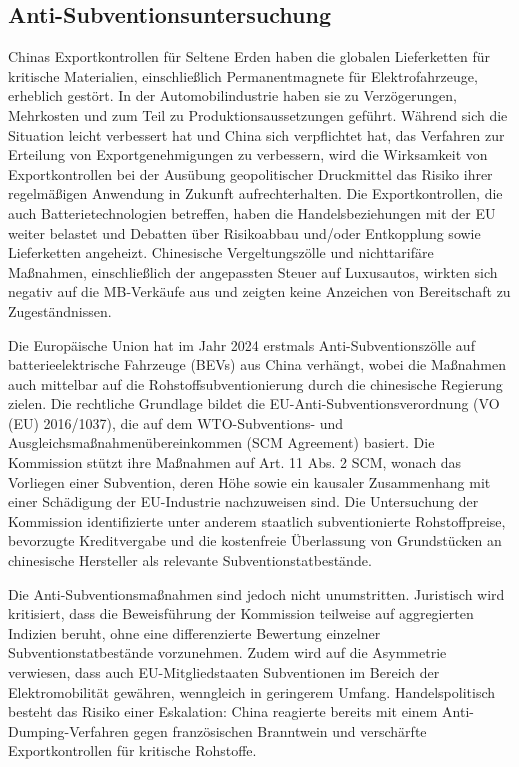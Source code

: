 \documentclass[12pt,a4paper,oneside]{book} %
\begin{document}
\subsection{Anti-Subventionsuntersuchung}
Chinas Exportkontrollen für Seltene Erden haben die globalen Lieferketten für kritische Materialien, einschließlich Permanentmagnete für Elektrofahrzeuge, erheblich gestört. In der Automobilindustrie haben sie zu Verzögerungen, Mehrkosten und zum Teil zu Produktionsaussetzungen geführt. Während sich die Situation leicht verbessert hat und China sich verpflichtet hat, das Verfahren zur Erteilung von Exportgenehmigungen zu verbessern, wird die Wirksamkeit von Exportkontrollen bei der Ausübung geopolitischer Druckmittel das Risiko ihrer regelmäßigen Anwendung in Zukunft aufrechterhalten. Die Exportkontrollen, die auch Batterietechnologien betreffen, haben die Handelsbeziehungen mit der EU weiter belastet und Debatten über Risikoabbau und/oder Entkopplung sowie Lieferketten angeheizt. Chinesische Vergeltungszölle und nichttarifäre Maßnahmen, einschließlich der angepassten Steuer auf Luxusautos, wirkten sich negativ auf die MB-Verkäufe aus und zeigten keine Anzeichen von Bereitschaft zu Zugeständnissen.

Die Europäische Union hat im Jahr 2024 erstmals Anti-Subventionszölle auf batterieelektrische Fahrzeuge (BEVs) aus China verhängt, wobei die Maßnahmen auch mittelbar auf die Rohstoffsubventionierung durch die chinesische Regierung zielen. Die rechtliche Grundlage bildet die EU-Anti-Subventionsverordnung (VO (EU) 2016/1037), die auf dem WTO-Subventions- und Ausgleichsmaßnahmenübereinkommen (SCM Agreement) basiert. Die Kommission stützt ihre Maßnahmen auf Art. 11 Abs. 2 SCM, wonach das Vorliegen einer Subvention, deren Höhe sowie ein kausaler Zusammenhang mit einer Schädigung der EU-Industrie nachzuweisen sind. Die Untersuchung der Kommission identifizierte unter anderem staatlich subventionierte Rohstoffpreise, bevorzugte Kreditvergabe und die kostenfreie Überlassung von Grundstücken an chinesische Hersteller als relevante Subventionstatbestände.

Die Anti-Subventionsmaßnahmen sind jedoch nicht unumstritten. Juristisch wird kritisiert, dass die Beweisführung der Kommission teilweise auf aggregierten Indizien beruht, ohne eine differenzierte Bewertung einzelner Subventionstatbestände vorzunehmen. Zudem wird auf die Asymmetrie verwiesen, dass auch EU-Mitgliedstaaten Subventionen im Bereich der Elektromobilität gewähren, wenngleich in geringerem Umfang. Handelspolitisch besteht das Risiko einer Eskalation: China reagierte bereits mit einem Anti-Dumping-Verfahren gegen französischen Branntwein und verschärfte Exportkontrollen für kritische Rohstoffe.
\end{document}
